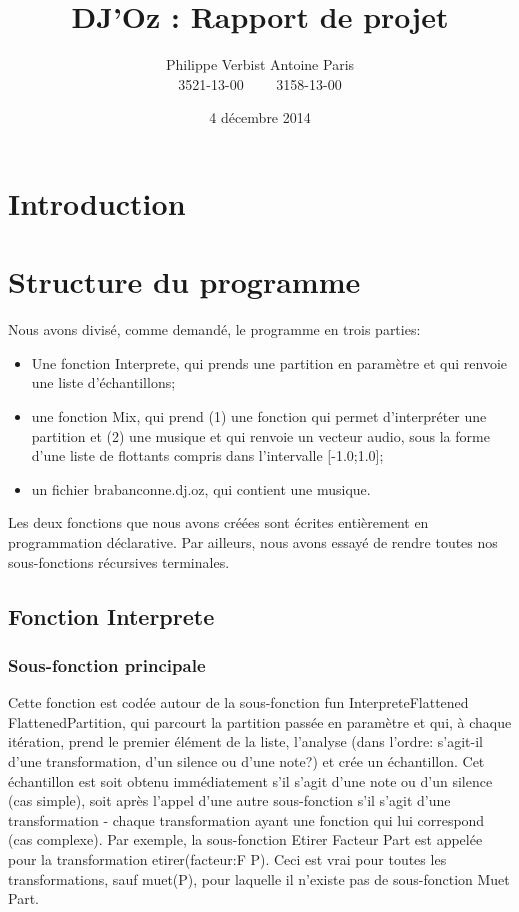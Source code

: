 \documentclass[12pt,a4paper]{article}
\author{Philippe Verbist  Antoine Paris\\3521-13-00 \ \ \ \ 3158-13-00}
\title{DJ'Oz : Rapport de projet}
\date{4 décembre 2014}
\begin{document}
\maketitle

\section{Introduction}

\section{Structure du programme}

Nous avons divisé, comme demandé, le programme en trois parties:
\begin{itemize}
\item Une fonction Interprete, qui prends une partition en paramètre et qui renvoie une liste d'échantillons;
\item une fonction Mix, qui prend (1) une fonction qui permet d'interpréter une partition  et (2) une musique et qui renvoie un vecteur audio, sous la forme d'une liste de flottants compris dans l'intervalle [-1.0;1.0];
\item un fichier brabanconne.dj.oz, qui contient une musique.
\end{itemize}

Les deux fonctions que nous avons créées sont écrites entièrement en programmation déclarative. Par ailleurs, nous avons essayé de rendre toutes nos sous-fonctions récursives terminales.

\subsection{Fonction Interprete}

\subsubsection{Sous-fonction principale}

Cette fonction est codée autour de la sous-fonction fun {InterpreteFlattened FlattenedPartition}, qui parcourt la partition passée en paramètre et qui, à chaque itération, prend le premier élément de la liste, l'analyse (dans l'ordre: s'agit-il d'une transformation, d'un silence ou d'une note?) et crée un échantillon. Cet échantillon est soit obtenu immédiatement s'il s'agit d'une note ou d'un silence (cas simple), soit après l'appel d'une autre sous-fonction s'il s'agit d'une transformation - chaque transformation ayant une fonction qui lui correspond (cas complexe). Par exemple, la sous-fonction {Etirer Facteur Part} est appelée pour la transformation etirer(facteur:F P). Ceci est vrai pour toutes les transformations, sauf muet(P), pour laquelle il n'existe pas de sous-fonction {Muet Part}.
\end{document}
